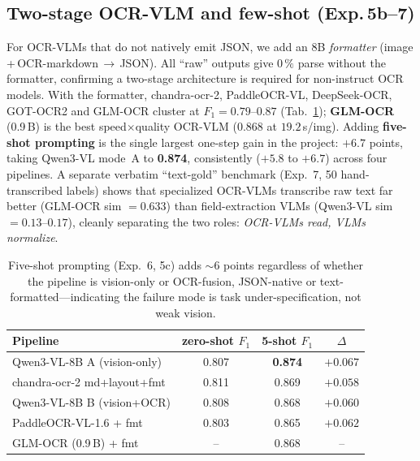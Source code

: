 \subsection{Two-stage OCR-VLM and few-shot (Exp.\,5b--7)}
\label{sec:twostage}
For OCR-VLMs that do not natively emit JSON, we add an 8B \emph{formatter}
(image\,+\,OCR-markdown\,$\rightarrow$\,JSON). All ``raw'' outputs give $0\,\%$
parse without the formatter, confirming a two-stage architecture is required
for non-instruct OCR models. With the formatter, chandra-ocr-2, PaddleOCR-VL,
DeepSeek-OCR, GOT-OCR2 and GLM-OCR cluster at $F_1=0.79$--$0.87$
(Tab.~\ref{tab:fewshot}); \textbf{GLM-OCR} (0.9\,B) is the best speed$\times$quality
OCR-VLM ($0.868$ at $19.2$\,s/img). Adding \textbf{five-shot prompting} is the
single largest one-step gain in the project: $+6.7$ points, taking Qwen3-VL
mode~A to \textbf{0.874}, consistently ($+5.8$ to $+6.7$) across four pipelines.
A separate verbatim ``text-gold'' benchmark (Exp.~7, 50 hand-transcribed
labels) shows that specialized OCR-VLMs transcribe raw text far better
(GLM-OCR sim $=0.633$) than field-extraction VLMs (Qwen3-VL sim $=0.13$--$0.17$),
cleanly separating the two roles: \emph{OCR-VLMs read, VLMs normalize}.

\begin{table}[t]
\centering
\small
\setlength{\tabcolsep}{3pt}
\begin{tabular}{@{}lccc@{}}
\toprule
Pipeline & zero-shot $F_1$ & 5-shot $F_1$ & $\Delta$ \\
\midrule
Qwen3-VL-8B A (vision-only) & 0.807 & \textbf{0.874} & $+0.067$ \\
chandra-ocr-2 md+layout+fmt & 0.811 & 0.869 & $+0.058$ \\
Qwen3-VL-8B B (vision+OCR)  & 0.808 & 0.868 & $+0.060$ \\
PaddleOCR-VL-1.6 + fmt      & 0.803 & 0.865 & $+0.062$ \\
GLM-OCR (0.9\,B) + fmt      & --    & 0.868 & -- \\
\bottomrule
\end{tabular}
\caption{Five-shot prompting (Exp.~6, 5c) adds $\sim$6 points regardless of
whether the pipeline is vision-only or OCR-fusion, JSON-native or
text-formatted---indicating the failure mode is task under-specification, not
weak vision.}
\label{tab:fewshot}
\end{table}

